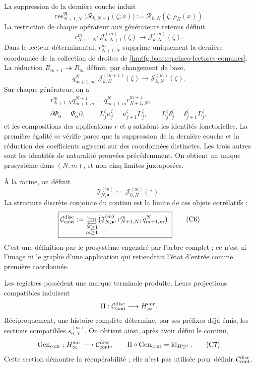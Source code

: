 La suppression de la dernière couche induit
\[
 \operatorname{res}^{\mathfrak R}_{N+1,N}
 \bigl(\mathscr R_{k,N+1}(\zeta;x)\bigr)
 :=\mathscr R_{k,N}(\zeta;\rho_N(x)).
\]
La restriction de chaque opérateur aux générateurs retenus définit
\[
 r^m_{N+1,N}:\mathcal J_{k,N+1}^{(m)}(\zeta)
 \longrightarrow\mathcal J_{k,N}^{(m)}(\zeta).
\]
Dans le lecteur déterminantal, \(r^m_{N+1,N}\) supprime uniquement la dernière
coordonnée de la collection de droites de
\eqref{hmtfg:base:eq:cinco-lectores-comunes}. La réduction
\(R_{m+1}\twoheadrightarrow R_m\) définit, par changement de base,
\[
 q^N_{m+1,m}:\mathcal J_{k,N}^{(m+1)}(\zeta)
 \longrightarrow\mathcal J_{k,N}^{(m)}(\zeta).
\]
Sur chaque générateur, on a
\[
\begin{gathered}
 r^m_{N+1,N}q^{N+1}_{m+1,m}
 =q^N_{m+1,m}r^{m+1}_{N+1,N},\\
 \partial\Psi_\alpha=\Psi_\alpha\partial,
 \qquad L_j^\zeta\kappa_j^\zeta
       =\kappa_{j+1}^\zeta L_j^\zeta,
 \qquad L_j^\zeta\delta_j^\zeta
       =\delta_{j+1}^\zeta L_j^\zeta,
\end{gathered}
\tag{C4}
\label{hmtfg:base:eq:naturalidad-D}
\]
et les compositions des applications \(r\) et \(q\) satisfont les identités
fonctorielles. La première égalité se vérifie parce que la suppression de la dernière couche et
la réduction des coefficients agissent sur des coordonnées distinctes. Les trois autres
sont les identités de naturalité prouvées précédemment. On obtient un unique
prosystème dans \((N,m)\), et non cinq limites juxtaposées.

À la racine, on définit
\[
 \mathfrak J_{N,\bullet}^{(m)}:=\mathcal J_{0,N}^{(m)}(\ast).
\tag{C5}
\label{hmtfg:base:eq:fibras-conjuntas-horizonte}
\]
La structure discrète conjointe du continu est la limite de ces objets corrélatifs :
\[
 \boxed{
 \mathcal C_{\rm cont}^{\rm disc}
 :=\varprojlim_{\substack{N\geq1\\m\geq1}}
   \bigl(\mathfrak J_{N,\bullet}^{(m)},
         r^m_{N+1,N},q^N_{m+1,m}\bigr).}
\tag{C6}
\label{hmtfg:base:eq:continuo-discreto}
\]
C'est une définition par le prosystème engendré par l'arbre complet ; ce n'est
ni l'image ni le graphe d'une application qui retiendrait l'état d'entrée comme
première coordonnée.

Les registres possèdent une marque terminale produite. Leurs projections compatibles induisent
\[
 \Pi:\mathcal C_{\rm cont}^{\rm disc}\longrightarrow H_\infty^{\rm enr}.
\]
Réciproquement, une histoire complète détermine, par ses préfixes déjà émis, les sections compatibles \(s_{0,N}^{(m)}\). On obtient ainsi, après avoir défini le continu,
\[
 \operatorname{Gen}_{\rm cont}:H_\infty^{\rm enr}
 \longrightarrow\mathcal C_{\rm cont}^{\rm disc},
 \qquad
 \Pi\circ\operatorname{Gen}_{\rm cont}
 =\operatorname{id}_{H_\infty^{\rm enr}}.
\tag{C7}
\label{hmtfg:base:eq:seccion-historias-continuo}
\]
Cette section démontre la récupérabilité ; elle n'est pas utilisée pour définir
\(\mathcal C_{\rm cont}^{\rm disc}\).

